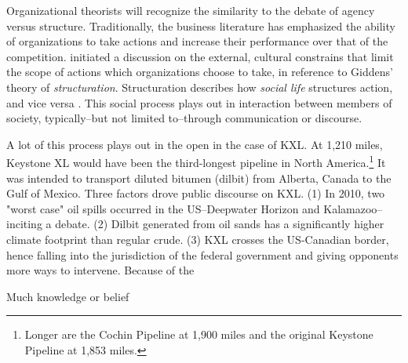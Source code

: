 \documentclass{article}
\begin{document}
	Organizational theorists will recognize the similarity to the debate of agency versus structure. Traditionally, the business literature has emphasized the ability of organizations to take actions and increase their performance over that of the competition. \citet{DiMaggio1983} initiated a discussion on the external, cultural constrains that limit the scope of actions which organizations choose to take, in reference to Giddens' theory of \textit{structuration}. Structuration describes how \textit{social life} structures action, and vice versa \citep[p. 69]{Giddens1979}. This social process plays out in interaction between members of society, typically--but not limited to--through communication or discourse.

	A lot of this process plays out in the open in the case of KXL. At 1,210 miles, Keystone XL would have been the third-longest pipeline in North America.\footnote{Longer are the Cochin Pipeline at 1,900 miles and the original Keystone Pipeline at 1,853 miles.} It was intended to transport diluted bitumen (dilbit) from Alberta, Canada to the Gulf of Mexico. Three factors drove public discourse on KXL. (1) In 2010, two "worst case" oil spills occurred in the US--Deepwater Horizon and Kalamazoo--inciting a debate. (2) Dilbit generated from oil sands has a significantly higher climate footprint than regular crude.  (3) KXL crosses the US-Canadian border, hence falling into the jurisdiction of the federal government and giving opponents more ways to intervene. Because of the 

	Much knowledge or belief 


\end{document}
